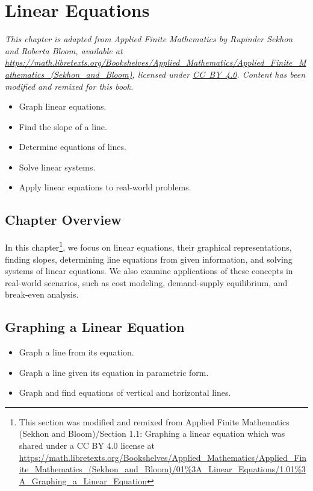 
\chapter{Linear Equations}

\noindent\textit{This chapter is adapted from \emph{Applied Finite Mathematics} by Rupinder Sekhon and Roberta Bloom, available at
\url{https://math.libretexts.org/Bookshelves/Applied_Mathematics/Applied_Finite_Mathematics_(Sekhon_and_Bloom)},
licensed under \href{https://creativecommons.org/licenses/by/4.0/}{CC~BY~4.0}.
Content has been modified and remixed for this book.}

\medskip

\begin{outcome}
\begin{itemize}
\item Graph linear equations.
\item Find the slope of a line.
\item Determine equations of lines.
\item Solve linear systems.
\item Apply linear equations to real-world problems.
\end{itemize}
\end{outcome}

\section*{Chapter Overview}
In this chapter\footnote{This section was modified and remixed from 
Applied Finite Mathematics (Sekhon and Bloom)/Section 1.1: Graphing a linear equation which was shared under a CC BY 4.0 license at 
\url{https://math.libretexts.org/Bookshelves/Applied_Mathematics/Applied_Finite_Mathematics_(Sekhon_and_Bloom)/01\%3A_Linear_Equations/1.01\%3A_Graphing_a_Linear_Equation}
}, 
we focus on linear equations, their graphical representations, finding slopes, determining line equations from given information, and solving systems of linear equations. We also examine applications of these concepts in real-world scenarios, such as cost modeling, demand-supply equilibrium, and break-even analysis.

\section{Graphing a Linear Equation}
\begin{outcome}
\begin{itemize}
\item Graph a line from its equation.
\item Graph a line given its equation in parametric form.
\item Graph and find equations of vertical and horizontal lines.
\end{itemize}
\end{outcome}

